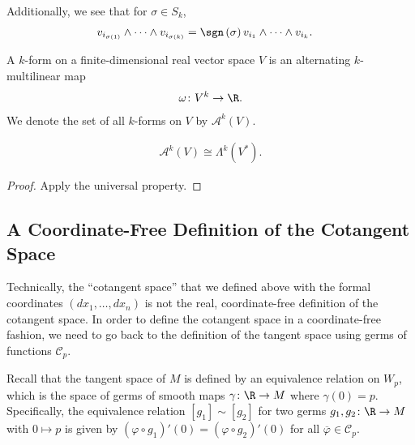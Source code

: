 \documentclass[10pt]{mypackage}
\begin{document}
Additionally, we see that for $\sigma\in S_{k}$,
\begin{align*}
  v_{i_{\sigma(1)}}\wedge\cdots\wedge v_{i_{\sigma(k)}} &= \sgn\left( \sigma \right) v_{i_1}\wedge\cdots\wedge v_{i_k}.
\end{align*}
\begin{definition}
  A $k$-form on a finite-dimensional real vector space $V$ is an alternating $k$-multilinear map
  \begin{align*}
    \omega\colon V^{k}\rightarrow \R.
  \end{align*}
  We denote the set of all $k$-forms on $V$ by $\mathcal{A}^{k}\left( V \right)$.
\end{definition}
\begin{proposition}
\begin{align*}
  \mathcal{A}^{k}\left( V \right)\cong \Lambda^{k}\left( V^{\ast} \right).
\end{align*}
\end{proposition}
\begin{proof}
  Apply the universal property.
\end{proof}
\subsection{A Coordinate-Free Definition of the Cotangent Space}%
Technically, the ``cotangent space'' that we defined above with the formal coordinates $\left( dx_1,\dots,dx_n \right)$ is not the real, coordinate-free definition of the cotangent space. In order to define the cotangent space in a coordinate-free fashion, we need to go back to the definition of the tangent space using germs of functions $\mathcal{C}_{p}$.\newline

Recall that the tangent space of $M$ is defined by an equivalence relation on $W_p$, which is the space of germs of smooth maps $\gamma\colon \R\rightarrow M$ where $\gamma(0) = p$. Specifically, the equivalence relation $\left[ g_1 \right] \sim \left[ g_2 \right]$ for two germs $g_1,g_2\colon \R\rightarrow M$ with $0\mapsto p$ is given by $\left( \varphi\circ g_1 \right)'(0) = \left( \varphi\circ g_2 \right)'(0)$ for all $ \overline{\varphi}\in \mathcal{C}_p$.\newline
\end{document}
